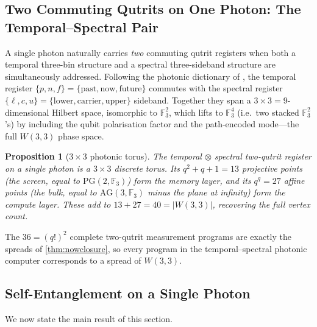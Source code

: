 ﻿\documentclass[12pt]{article}
\newtheorem{proposition}[theorem]{Proposition}
\newcommand{\GF}[1]{\mathbb{F}_{#1}}
\newcommand{\PG}[2]{\mathrm{PG}(#1,#2)}
\newcommand{\AG}[2]{\mathrm{AG}(#1,#2)}
\begin{document}
\subsection{Two Commuting Qutrits on One Photon: The Temporal--Spectral Pair}

A single photon naturally carries \emph{two} commuting qutrit registers when both a
temporal three-bin structure and a spectral three-sideband structure are
simultaneously addressed.  Following the photonic dictionary of
\cite[\S 3]{Vlasov2025}, the temporal register $\{p,n,f\} = \{\text{past},
\text{now}, \text{future}\}$ commutes with the spectral register
$\{\ell, c, u\} = \{\text{lower}, \text{carrier}, \text{upper}\}$ sideband.
Together they span a $3\times 3 = 9$-dimensional Hilbert space, isomorphic to
$\GF{3}^2$, which lifts to $\GF{3}^4$ (i.e.\ two stacked $\GF{3}^2$'s) by
including the qubit polarisation factor and the path-encoded mode---the full
$W(3,3)$ phase space.

\begin{proposition}[$3\times 3$ photonic torus]\label{prop:33torus}
The temporal $\otimes$ spectral two-qutrit register on a single photon is a
$3\times 3$ discrete torus.  Its $q^2+q+1 = 13$ projective points (the
\emph{screen}, equal to $\PG{2}{\GF{3}}$) form the \emph{memory layer}, and its
$q^q = 27$ affine points (the \emph{bulk}, equal to $\AG{3}{\GF{3}}$ minus the
plane at infinity) form the \emph{compute layer}.  These add to $13 + 27 = 40 =
|W(3,3)|$, recovering the full vertex count.
\end{proposition}

The $36 = (q!)^2$ complete two-qutrit measurement programs are exactly the
spreads of \cref{thm:nowclosure}, so every program in the temporal--spectral
photonic computer corresponds to a spread of $W(3,3)$.

\subsection{Self-Entanglement on a Single Photon}

We now state the main result of this section.
\end{document}
